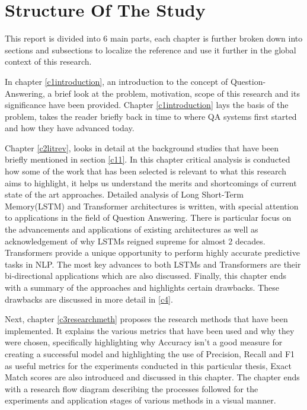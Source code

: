 \documentclass[a4paper,12pt]{report}
\begin{document}
        \section{Structure Of The Study}\label{15}

        This report is divided into 6 main parts, each chapter is further broken down into sections and subsections to localize the reference and use it further in the global context of this research.

        In chapter \ref{c1introduction}, an introduction to the concept of Question-Answering, a brief look at the problem, motivation, scope of this research and its significance have been provided. Chapter \ref{c1introduction} lays the basis of the problem, takes the reader briefly back in time to where QA systems first started and how they have advanced today.

        Chapter \ref{c2litrev}, looks in detail at the background studies that have been briefly mentioned in section \ref{c11}. In this chapter critical analysis is conducted how some of the work that has been selected is relevant to what this research aims to highlight, it helps us understand the merits and shortcomings of current state of the art approaches. Detailed analysis of Long Short-Term Memory(LSTM) and Transformer architectures is written, with special attention to applications in the field of Question Answering. There is particular focus on the advancements and applications of existing architectures as well as acknowledgement of why LSTMs reigned supreme for almost 2 decades. Transformers provide a unique opportunity to perform highly accurate predictive tasks in NLP. The most key advances to both LSTMs and Transformers are their bi-directional applications which are also discussed. Finally, this chapter ends with a summary of the approaches and highlights certain drawbacks. These drawbacks are discussed in more detail in \ref{c4}.

        Next, chapter \ref{c3researchmeth} proposes the research methods that have been implemented. It explains the various metrics that have been used and why they were chosen, specifically highlighting why Accuracy isn't a good measure for creating a successful model and highlighting the use of Precision, Recall and F1 as useful metrics for the experiments conducted in this particular thesis, Exact Match scores are also introduced and discussed in this chapter. The chapter ends with a research flow diagram describing the processes followed for the experiments and application stages of various methods in a visual manner.
\end{document}
